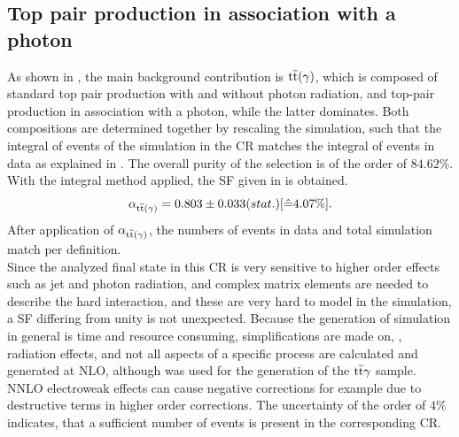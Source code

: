 \subsection{Top pair production in association with a photon}\label{sec:ttbar}
As shown in , the main background contribution is ${\mathrm{t}\overline{\mathrm{t}}}(\gamma)$, which is composed of standard top pair production with and without photon radiation, and top-pair production in association with a photon, while the latter dominates. Both compositions are determined together by rescaling the simulation, such that the integral of events of the simulation in the CR matches the integral of events in data as explained in . The overall purity of the selection is of the order of $84.62\%$.
%
With the integral method applied, the SF given in  is obtained.
\begin{equation}\label{eq:AlphaTT}
 \alpha_{{\mathrm{t}\overline{\mathrm{t}}}(\gamma)}=0.803 \pm 0.033 (stat.) [\hat{=}4.07\%].
\end{equation}
After application of $\alpha_{{\mathrm{t}\overline{\mathrm{t}}}(\gamma)}$, the numbers of events in data and total simulation match per definition.\\
Since the analyzed final state in this CR is very sensitive to higher order effects such as jet and photon radiation, and complex matrix elements are needed to describe the hard interaction, and these are very hard to model in the simulation, a SF differing from unity is not unexpected. Because the generation of simulation in general is time and resource consuming, simplifications are made on, \eg, radiation effects, and not all aspects of a specific process are calculated and generated at NLO, although \MCATNLO was used for the generation of the ${\mathrm{t}\overline{\mathrm{t}}}\gamma$ sample. NNLO electroweak effects can cause negative corrections for example due to destructive terms in higher order corrections. The uncertainty of the order of $4\%$ indicates, that a sufficient number of events is present in the corresponding CR.\\
